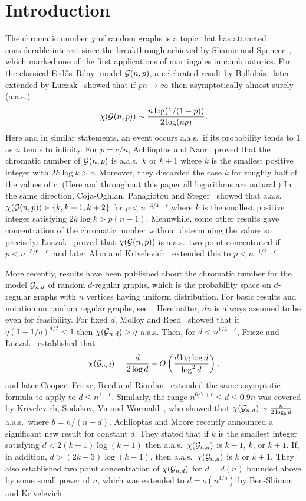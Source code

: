 \documentclass[12pt]{article}
\def\G{{\cal G}}
\def\eps{\epsilon}
\def\Gnd{\G_{n,d}}
\def\Gnp{{\cal G}(n,p)}
\begin{document}
\section{Introduction}
%
The chromatic number $\chi$ of random graphs is a topic that has attracted considerable interest since the breakthrough achieved by Shamir and Spencer~\cite{SS}, which marked one of the first applications of martingales in combinatorics.
%
For the classical Erd\H os--R\' enyi model $\Gnp$, a celebrated result by Bollob{\'a}s~\cite{boll88} later extended by {\L}uczak~\cite{L91} showed that if $pn\to\infty$ then asymptotically almost surely (a.a.s.)
\[
\chi(\Gnp)\sim \frac{n \log(1/(1-p))}{2\log(np)}.
\]
%
Here and in similar statements, an event occurs a.a.s.\ if its probability tends to 1 as $n$ tends to infinity.
%
For $p=c/n$, Achlioptas and Naor~\cite{AN} proved that the chromatic number of $\Gnp$ is a.a.s.\ $k$ or $k+1$ where $k$ is the smallest positive integer with $2k \log k > c$. Moreover, they discarded the case $k$ for roughly half of the values of $c$. (Here and throughout this paper all logarithms are natural.)
%
In the same direction, Coja-Oghlan, Panagiotou and Steger~\cite{CPS} showed that a.a.s.\ $\chi(\Gnp)\in\{ k,k+1,k+2\}$ for $p<n^{-3/4 -\eps}$    
where $k$ is the smallest positive integer satisfying $2k \log k > p(n-1)$.
%
Meanwhile, some other results gave concentration of the chromatic number without determining the values so precisely:
{\L}uczak~\cite{L91b} proved that $\chi(\Gnp)$ is a.a.s.\ two point concentrated if $p<n^{-5/6-\eps}$, and later Alon and Krivelevich~\cite{AK97} extended this to $p<n^{-1/2-\eps}$.



More recently, results have been published about the chromatic number for the model
$\Gnd$ of random $d$-regular graphs, which is the probability space on $d$-regular graphs with $n$ vertices having uniform distribution. For basic results and notation on random regular graphs, see~\cite{NW99}. Hereinafter, $dn$ is always assumed to be even for feasibility.
%
For fixed $d$, Molloy and Reed~\cite{MR} showed that if $q(1-1/q)^{d/2}<1$ then $\chi(\Gnd)>q$ a.a.s.
%
Then, for $d<n^{1/3-\eps}$, Frieze and {\L}uczak~\cite{FL92} established that
\[
\chi(\Gnd) = \frac{d}{2\log d}+O\left(\frac{d \log \log d}{\log^2 d}\right),
\]
and later Cooper, Frieze, Reed and Riordan~\cite{CFRR02} extended the same asymptotic formula to apply to $d\le n^{1-\eps}$. Similarly, the range $n^{6/7+\eps}\le d\le 0.9n$ was covered by Krivelevich, Sudakov, Vu and Wormald~\cite{KSVW01}, who showed that $\chi(\Gnd) \sim \frac{n}{2\log_b d}$  a.a.s.\ where $b=n/(n-d)$.
%
Achlioptas and Moore \cite{AM} recently announced a significant new result for constant $d$.
They stated that if $k$ is the smallest integer satisfying $d < 2(k-1)\log(k-1)$
then a.a.s.\  $\chi(\Gnd)$ is 
$k-1$, $k$, or $k+1$. If, in addition, $d > (2k-3)\log(k-1)$, then a.a.s.\ $\chi(\Gnd)$ is $k$ or $k+1$. 
%
They also established two point concentration of $\chi(\Gnd)$ for $d=d(n)$
bounded above by some small power of $n$, which was extended to 
$d=o(n^{1/5})$
by Ben-Shimon and Krivelevich~\cite{BK08}.
\end{document}
